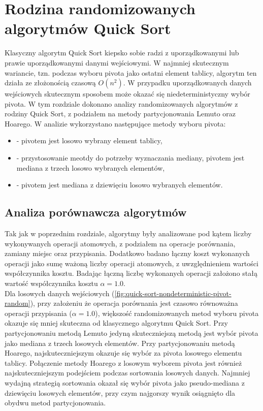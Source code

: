\section{Rodzina randomizowanych algorytmów Quick Sort}
Klasyczny algorytm Quick Sort kiepsko sobie radzi z uporządkowanymi lub prawie uporządkowanymi danymi wejściowymi. W najmniej skutecznym wariancie, tzn. podczas wyboru pivota jako ostatni element tablicy, algorytm ten działa ze złożonością czasową $O(n^2)$. W przypadku uporządkowanych danych wejściowych skutecznym sposobem może okazać się niedeterministyczny wybór pivota. W tym rozdziale dokonano analizy randomizowanych algorytmów z rodziny Quick Sort, z podziałem na metody partycjonowania Lemuto oraz Hoarego. W analizie wykorzystano następujące metody wyboru pivota:

\begin{itemize}
	\setlength\itemsep{0em}
	\item {} - pivotem jest losowo wybrany element tablicy,
	\item {} - przystosowanie meotdy  do potrzeby wyznaczania mediany, pivotem jest mediana z trzech losowo wybranych elementów,
	\item {} - pivotem jest mediana z dziewięciu losowo wybranych elementów.\\
\end{itemize}

\subsection{Analiza porównawcza algorytmów}
Tak jak w poprzednim rozdziale, algorytmy były analizowane pod kątem liczby wykonywanych operacji atomowych, z podziałem na operacje porównania, zamiany miejsc oraz przypisania. Dodatkowo badano łączny koszt wykonanych operacji jako sumę ważoną liczby operacji atomowych, z uwzględnieniem wartości współczynnika kosztu. Badając łączną liczbę wykonanych operacji założono stałą wartość współczynnika kosztu $\alpha = 1.0$.\\

Dla losowych danych wejściowych (\ref{fig:quick-sort-nondeterministic-pivot-random}), przy założeniu że operacja porównania jest czasowo równoważna operacji przypisania ($\alpha=1.0$), większość randomizowanych metod wyboru pivota okazuje się mniej skuteczna od klasycznego algorytmu Quick Sort. Przy partycjonowaniu metodą Lemuto jedyną skuteczniejszą metodą jest wybór pivota jako mediana z trzech losowych elementów. Przy partycjonowaniu metodą Hoarego, najskuteczniejszym okazuje się wybór za pivota losowego elementu tablicy. Połączenie metody Hoarego z losowym wyborem pivota jest również najskuteczniejszym podejściem podczas sortowania losowych danych. Najmniej wydajną strategią sortowania okazał się wybór pivota jako pseudo-mediana z dziewięciu losowych elementów, przy czym najgorszy wynik osiągnięto dla obydwu metod partycjonowania.\\

